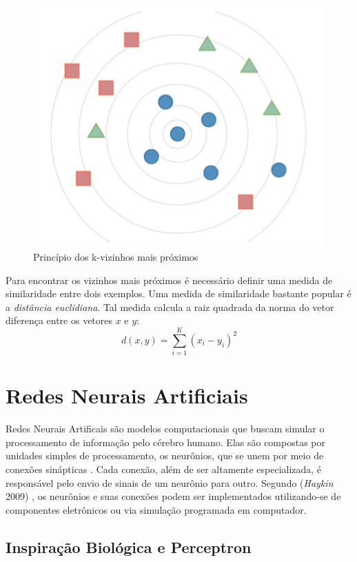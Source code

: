 \begin{figure}[h]
	\centering
	\includegraphics[scale=0.5]{pasta1_figuras/knn.png}
	\caption{Princípio dos k-vizinhos mais próximos}
	\label{fig-knn}
\end{figure}

Para encontrar os vizinhos mais próximos é necessário definir uma medida de similaridade entre dois exemplos. Uma medida de similaridade bastante popular é a \textit{distância euclidiana}. Tal medida calcula a raiz quadrada da norma do vetor diferença entre os vetores $x$ e $y$:
\begin{equation} \label{eq_disteucli}
d(x,y)= \sum_{i=1}^{K} (x_i - y_i)^2
\end{equation}

\section{Redes Neurais Artificiais}
Redes Neurais Artificais são modelos computacionais que buscam simular o processamento de informação pelo cérebro humano. Elas são compostas por unidades simples de processamento, os neurônios, que se unem por meio de conexões sinápticas \cite{zhang1998}. Cada conexão, além de ser altamente especializada, é responsável pelo envio de sinais de um neurônio para outro. Segundo (\textit{Haykin} 2009\cite{haykin2009}) , os neurônios e suas conexões podem ser implementados utilizando-se de componentes eletrônicos ou via simulação programada em computador.

\subsection{Inspiração Biológica e Perceptron}


